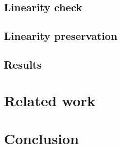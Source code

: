 \documentclass{mproj}
\begin{document}
\section{Linearity check}\label{linearity-check}

\section{Linearity preservation}\label{linearity-preservation}

\section{Results}\label{results}

\chapter{Related work}\label{related-work}

\chapter{Conclusion}\label{conclusion}



\end{document}

